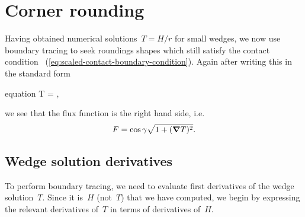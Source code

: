 \begin{figure}
\end{figure}

\section{Corner rounding}
\label{sec:small.rounding}

Having obtained numerical solutions~$T = H / r$ for small wedges,
we now use boundary tracing to seek roundings shapes
which still satisfy the contact condition~%
  (\ref{eq:scaled-contact-boundary-condition}).
Again after writing this in the standard form
\begin{important}{equation}
  \normalvec \dotp \del T = \cos\gamma {},
  \label{eq:small-flux-boundary-condition}
\end{important}
we see that the flux function is the right hand side, i.e.
\begin{equation}
  F = \cos\gamma \sqrt{1 + (\mathop{}\!\boldsymbol{\mathbf{\nabla}} T)^2}.
  \label{eq:small-flux-function}
\end{equation}

\subsection{Wedge solution derivatives}
\label{sec:small.rounding.derivatives}

To perform boundary tracing,
we need to evaluate first derivatives of the wedge solution~$T$.
Since it is~$H$ (not~$T$) that we have computed,
we begin by expressing the relevant derivatives of~$T$
in terms of derivatives of~$H$.

